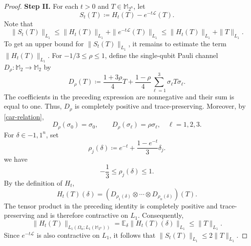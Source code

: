\documentclass{amsbook}
\theoremstyle{definition}
\theoremstyle{remark}
\numberwithin{section}{chapter}
\numberwithin{equation}{chapter}
\newcommand{\M}{\mathbb{M}}
\newcommand{\1}{\mathbf{1}}
\begin{document}
\begin{proof}
{\bf Step II.} For each $t>0$ and $T\in \M_{2^{n}}$, let
\[
S_{t}(T)\coloneqq H_{t}(T)-e^{-t\mathcal{L}}(T).
\]
Note that
\[
\|S_{t}(T)\|_{L_{1}}\leq \|H_{t}(T)\|_{L_{1}}+\|e^{-t\mathcal{L}}(T)\|_{L_{1}}\leq \|H_{t}(T)\|_{L_{1}}+\|T\|_{L_{1}}.
\]
To get an upper bound for $\|S_{t}(T)\|_{L_{1}}$, it remains to estimate the term $\|H_{t}(T)\|_{L_{1}}$. 
For
	$-1/3\leq\rho\leq1$, define the single-qubit Pauli channel
	$D_\rho:\mathbb M_2\to\mathbb M_2$ by
	\[
	D_\rho(T)
	\coloneqq
	\frac{1+3\rho}{4}T
	+
	\frac{1-\rho}{4}
	\sum_{\ell=1}^3\sigma_\ell T\sigma_\ell.
	\]
	The coefficients in the preceding expression are nonnegative and
	their sum is equal to one. Thus, $D_\rho$ is completely positive
	and trace-preserving. Moreover, by \eqref{car-relation}, 
	\[
	D_\rho(\sigma_0)=\sigma_0,
	\qquad
	D_\rho(\sigma_\ell)=\rho\sigma_\ell,
	\quad \ell=1,2,3.
	\]
For $\delta\in{-1,1}^{n}$, set
	\[
	\rho_j(\delta)\coloneqq e^{-t}+\frac{1-e^{-t}}{3}\delta_j.
	\]
we have
	\[-\frac13\leq\rho_j(\delta)\leq1.\]
By the definition of $H_t$,
	\[
	H_t(T)(\delta)
	=
	\left(
	D_{\rho_1(\delta)}
	\otimes\cdots\otimes
	D_{\rho_n(\delta)}
	\right)(T).
	\]
The tensor product in the preceding identity is completely positive
	and trace-preserving and is therefore contractive on $L_1$.
	Consequently,
\[\|H_t(T)\|_{L_1(\Omega_n;L_1(\mathbb M_{2^n}))}=
		\mathbb E_{\delta}
		\|H_t(T)(\delta)\|_{L_1}\leq
		\|T\|_{L_1}.\]
	Since $e^{-t\mathcal L}$ is also contractive on $L_1$, it follows that $\|S_{t}(T)\|_{L_{1}}\leq 2\|T\|_{L_{1}}$.


\end{proof}
\end{document}
